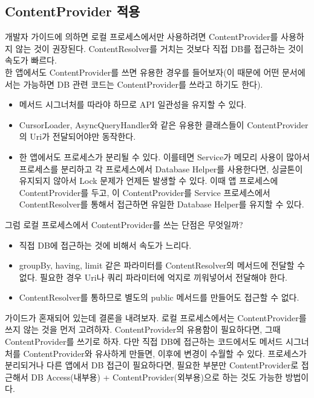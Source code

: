 \subsection{ContentProvider 적용}
개발자 가이드에 의하면 로컬 프로세스에서만 사용하려면 ContentProvider를 사용하지 않는 것이 권장된다. 
ContentResolver를 거치는 것보다 직접 DB를 접근하는 것이 속도가 빠르다.\\

한 앱에서도 ContentProvider를 쓰면 유용한 경우를 들어보자(이 때문에 어떤 문서에서는 가능하면 DB 관련 코드는 ContentProvider를 쓰라고 하기도 한다).
\begin{itemize}
\item 메서드 시그너처를 따라야 하므로 API 일관성을 유지할 수 있다.
\item CursorLoader, AsyncQueryHandler와 같은 유용한 클래스들이 ContentProvider의 Uri가 전달되어야만 동작한다.
\item 한 앱에서도 프로세스가 분리될 수 있다. 이를테면 Service가 메모리 사용이 많아서 프로세스를 분리하고 각 프로세스에서 Database Helper를 사용한다면, 싱글톤이 유지되지 않아서 Lock 문제가 언제든 발생할 수 있다.
이때 앱 프로세스에 ContentProvider를 두고, 이 ContentProvider를 Service 프로세스에서 ContentResolver를 통해서 접근하면 유일한 Database Helper를 유지할 수 있다. %
\end {itemize}

그럼 로컬 프로세스에서 ContentProvider를 쓰는 단점은 무엇일까?
\begin{itemize}
\item 직접 DB에 접근하는 것에 비해서 속도가 느리다.
\item groupBy, having, limit 같은 파라미터를 ContentResolver의 메서드에 전달할 수 없다. 
필요한 경우 Uri나 쿼리 파라미터에 억지로 끼워넣어서 전달해야 한다. 
\item ContentResolver를 통하므로 별도의 public 메서드를 만들어도 접근할 수 없다.
\end {itemize}

가이드가 혼재되어 있는데 결론을 내려보자.
로컬 프로세스에서는 ContentProvider를 쓰지 않는 것을 먼저 고려하자. ContentProvider의 유용함이 필요하다면, 그때 ContentProvider를 쓰기로 하자.
다만 직접 DB에 접근하는 코드에서도 메서드 시그너처를 ContentProvider와 유사하게 만들면, 이후에 변경이 수월할 수 있다.
프로세스가 분리되거나 다른 앱에서 DB 접근이 필요하다면, 필요한 부분만 ContentProvider로 접근해서 DB Access(내부용) + ContentProvider(외부용)으로 하는 것도 가능한 방법이다.\\

